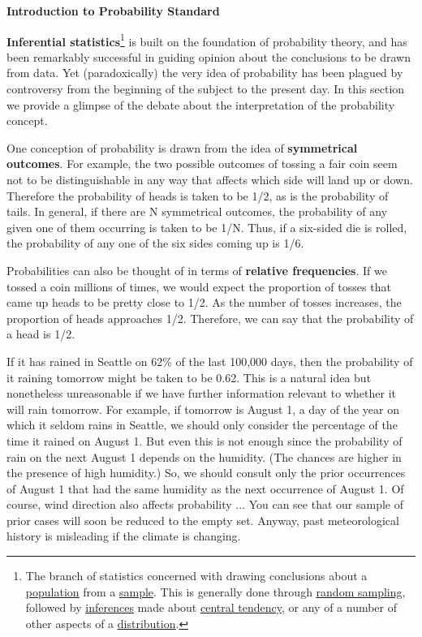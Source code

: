 \documentclass{book}
\begin{document}
\textbf{Introduction to Probability Standard}

\textbf{Inferential statistics}\footnote{The branch of statistics concerned
  with drawing conclusions about a
  \href{https://onlinestatbook.com/2/glossary/population.html}{\underline{population}}
  from a
  \href{https://onlinestatbook.com/2/glossary/sample.html}{\underline{sample}}.
  This is generally done through
  \href{https://onlinestatbook.com/2/glossary/random_sampling.html}{\underline{random
  sampling}}, followed by
  \href{https://onlinestatbook.com/2/glossary/inference.html}{\underline{inferences}}
  made about
  \href{https://onlinestatbook.com/2/glossary/center(distribution).html}{\underline{central
  tendency}}, or any of a number of other aspects of a
  \href{https://onlinestatbook.com/2/glossary/distribution.html}{\underline{distribution}}.}
is built on the foundation of probability theory, and has been remarkably
successful in guiding opinion about the conclusions to be drawn from data. Yet
(paradoxically) the very idea of probability has been plagued by controversy
from the beginning of the subject to the present day. In this section we
provide a glimpse of the debate about the interpretation of the probability
concept.

One conception of probability is drawn from the idea of \textbf{symmetrical
outcomes}. For example, the two possible outcomes of tossing a fair coin seem
not to be distinguishable in any way that affects which side will land up or
down. Therefore the probability of heads is taken to be 1/2, as is the
probability of tails. In general, if there are N symmetrical outcomes, the
probability of any given one of them occurring is taken to be 1/N. Thus, if a
six-sided die is rolled, the probability of any one of the six sides coming up
is 1/6.

Probabilities can also be thought of in terms of \textbf{relative
frequencies}. If we tossed a coin millions of times, we would expect the
proportion of tosses that came up heads to be pretty close to 1/2. As the
number of tosses increases, the proportion of heads approaches 1/2. Therefore,
we can say that the probability of a head is 1/2.

If it has rained in Seattle on 62\% of the last 100,000 days, then the
probability of it raining tomorrow might be taken to be 0.62. This is a
natural idea but nonetheless unreasonable if we have further information
relevant to whether it will rain tomorrow. For example, if tomorrow is August
1, a day of the year on which it seldom rains in Seattle, we should only
consider the percentage of the time it rained on August 1. But even this is
not enough since the probability of rain on the next August 1 depends on the
humidity. (The chances are higher in the presence of high humidity.) So, we
should consult only the prior occurrences of August 1 that had the same
humidity as the next occurrence of August 1. Of course, wind direction also
affects probability ... You can see that our sample of prior cases will soon
be reduced to the empty set. Anyway, past meteorological history is misleading
if the climate is changing.
\end{document}
